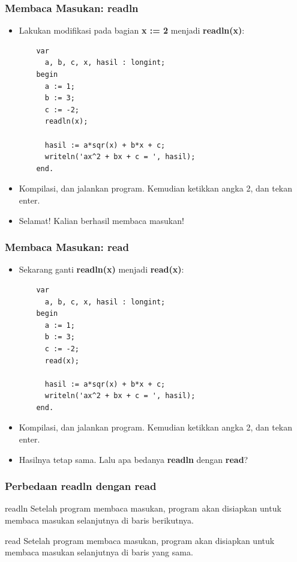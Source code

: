 \documentclass{beamer}
\begin{document}
\begin{frame}[fragile]
\frametitle{Membaca Masukan: readln}
\begin{itemize}
  \item Lakukan modifikasi pada bagian \textbf{x := 2} menjadi \textbf{readln(x)}:
  \begin{lstlisting}
    var
      a, b, c, x, hasil : longint;
    begin
      a := 1;
      b := 3;
      c := -2;
      readln(x);

      hasil := a*sqr(x) + b*x + c;
      writeln('ax^2 + bx + c = ', hasil);
    end.
  \end{lstlisting}
  \item Kompilasi, dan jalankan program. Kemudian ketikkan angka 2, dan tekan enter.
  \item Selamat! Kalian berhasil membaca masukan!
\end{itemize}
\end{frame}

\begin{frame}[fragile]
\frametitle{Membaca Masukan: read}
\begin{itemize}
  \item Sekarang ganti \textbf{readln(x)} menjadi \textbf{read(x)}:
  \begin{lstlisting}
    var
      a, b, c, x, hasil : longint;
    begin
      a := 1;
      b := 3;
      c := -2;
      read(x);

      hasil := a*sqr(x) + b*x + c;
      writeln('ax^2 + bx + c = ', hasil);
    end.
  \end{lstlisting}
  \item Kompilasi, dan jalankan program. Kemudian ketikkan angka 2, dan tekan enter.
  \item Hasilnya tetap sama. Lalu apa bedanya \textbf{readln} dengan \textbf{read}?
\end{itemize}
\end{frame}

\begin{frame}[fragile]
\frametitle{Perbedaan readln dengan read}
\begin{block}{readln}
  Setelah program membaca masukan, program akan disiapkan untuk membaca masukan selanjutnya di \alert{baris berikutnya}.
\end{block}
\begin{block}{read}
  Setelah program membaca masukan, program akan disiapkan untuk membaca masukan selanjutnya di \alert{baris yang sama}.
\end{block}
\end{frame}
\end{document}

